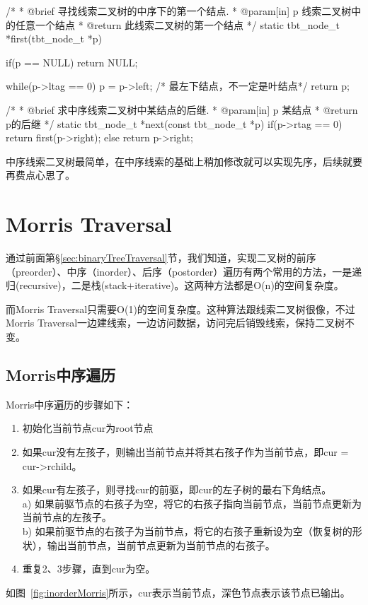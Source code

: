 \begin{Codex}[label=theaded_binary_tree.c]
 /*
  * @brief 寻找线索二叉树的中序下的第一个结点.
  * @param[in] p 线索二叉树中的任意一个结点
  * @return 此线索二叉树的第一个结点
  */
static tbt_node_t *first(tbt_node_t *p) {
    if(p == NULL)  return NULL;

    while(p->ltag == 0) {
        p = p->left;  /* 最左下结点，不一定是叶结点*/
    }
    return p;
}

 /*
  * @brief 求中序线索二叉树中某结点的后继.
  * @param[in] p 某结点
  * @return p的后继
  */
static tbt_node_t *next(const tbt_node_t *p) {
    if(p->rtag == 0) {
        return first(p->right);
    } else {
        return p->right;
    }
}
\end{Codex}

中序线索二叉树最简单，在中序线索的基础上稍加修改就可以实现先序，后续就要再费点心思了。


\section{Morris Traversal} %
通过前面第\S \ref{sec:binaryTreeTraversal}节，我们知道，实现二叉树的前序（preorder）、中序（inorder）、后序（postorder）遍历有两个常用的方法，一是递归(recursive)，二是栈(stack+iterative)。这两种方法都是O(n)的空间复杂度。

而Morris Traversal只需要O(1)的空间复杂度。这种算法跟线索二叉树很像，不过Morris Traversal一边建线索，一边访问数据，访问完后销毁线索，保持二叉树不变。

\subsection{Morris中序遍历}
Morris中序遍历的步骤如下：
\begin{enumerate}
\item 初始化当前节点cur为root节点
\item 如果cur没有左孩子，则输出当前节点并将其右孩子作为当前节点，即cur = cur->rchild。
\item 如果cur有左孩子，则寻找cur的前驱，即cur的左子树的最右下角结点。\\
   a) 如果前驱节点的右孩子为空，将它的右孩子指向当前节点，当前节点更新为当前节点的左孩子。\\
   b) 如果前驱节点的右孩子为当前节点，将它的右孩子重新设为空（恢复树的形状），输出当前节点，当前节点更新为当前节点的右孩子。
\item 重复2、3步骤，直到cur为空。
\end{enumerate}
如图~\ref{fig:inorderMorris}所示，cur表示当前节点，深色节点表示该节点已输出。

